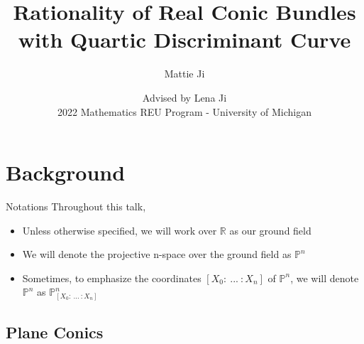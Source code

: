 \documentclass[hyperref, notheorems]{beamer}
\title{Rationality of Real Conic Bundles with Quartic Discriminant Curve}
\author{Mattie Ji}
\institute{Brown University}
\date{Advised by Lena Ji\\ 2022 Mathematics REU Program - University of Michigan}
\newcommand{\Rbb}{\mathbb{R}}
\newcommand{\Pbb}{\mathbb{P}}
\theoremstyle{definition}
\begin{document}
\begin{frame}
    \titlepage
\end{frame}



\section{Background}



\begin{frame}{Notations}
    Throughout this talk,
    \begin{itemize}
        \item Unless otherwise specified, we will work over $\Rbb$ as our ground field
        \item We will denote the projective n-space over the ground field as $\Pbb^n$
        \item Sometimes, to emphasize the coordinates $[X_0 :\ ...\ : X_n]$ of $\Pbb^n$, we will denote $\Pbb^n$ as $\Pbb^n_{[X_0 :\ ...\ : X_n]}$
    \end{itemize}
\end{frame}

    \subsection{Plane Conics}
\end{document}
